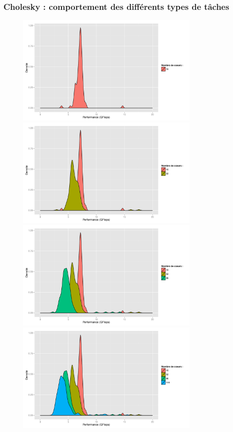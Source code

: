 \documentclass[xcolor={usenames,dvipsnames,svgnames,table}, aspectratio=43]{beamer}
\begin{document}
\begin{frame}
  \frametitle{Cholesky : comportement des différents types de tâches}
  \begin{figure}
     {%
      \includegraphics[width=0.8\textwidth]{graph/anim-distrib/graph_anim_distrib.pdf}%
    }%
     {%
      \includegraphics[width=0.8\textwidth]{graph/anim-distrib/graph_anim_distrib_1.pdf}%
    }%
     {%
      \includegraphics[width=0.8\textwidth]{graph/anim-distrib/graph_anim_distrib_2.pdf}%
    }%
     {%
      \includegraphics[width=0.8\textwidth]{graph/anim-distrib/graph_anim_distrib_3.pdf}%
}
\end{figure}
\end{frame}
\end{document}

